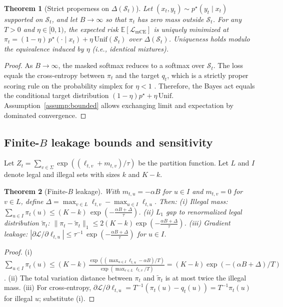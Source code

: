 \documentclass{article}
\newtheorem{theorem}{Theorem}
\begin{document}
\begin{theorem}[Strict properness on $\Delta(\mathcal{S}_t)$]\label{thm:proper}
Let $(x_t,y_t)\sim p^\star(y_t\mid x_t)$ supported on $\mathcal{S}_t$, and let $B\to\infty$ so that $\pi_t$ has zero mass outside $\mathcal{S}_t$. For any $T>0$ and $\eta\in[0,1)$, the expected risk $\mathbb{E}[\mathcal{L}_{\mathrm{mCE}}]$ is uniquely minimized at $\pi_t = (1-\eta)\,p^\star(\cdot\mid x_t) + \eta\,\mathrm{Unif}(\mathcal{S}_t)$ over $\Delta(\mathcal{S}_t)$. Uniqueness holds modulo the equivalence induced by $\eta$ (i.e., identical mixtures).
\end{theorem}

\begin{proof}
As $B\to\infty$, the masked softmax reduces to a softmax over $\mathcal{S}_t$. The loss equals the cross-entropy between $\pi_t$ and the target $q_t$, which is a strictly proper scoring rule on the probability simplex for $\eta<1$ \cite{gneiting2007scoring}. Therefore, the Bayes act equals the conditional target distribution $(1-\eta)p^\star+\eta\,\mathrm{Unif}$. Assumption~\ref{assump:bounded} allows exchanging limit and expectation by dominated convergence.
\end{proof}

\subsection{Finite-$B$ leakage bounds and sensitivity}
Let $Z_t=\sum_{v\in\Sigma}\exp((\ell_{t,v}+m_{t,v})/\tau)$ be the partition function. Let $L$ and $I$ denote legal and illegal sets with sizes $k$ and $K-k$.

\begin{theorem}[Finite-$B$ leakage]\label{thm:finiteB}
With $m_{t,u}=-\alpha B$ for $u\in I$ and $m_{t,v}=0$ for $v\in L$, define $\Delta=\max_{v\in L}\ell_{t,v}-\max_{u\in I}\ell_{t,u}$. Then:
(i) Illegal mass: $\sum_{u\in I}\pi_t(u) \le (K-k)\,\exp\!\left(-\frac{\alpha B + \Delta}{\tau}\right)$.
(ii) $L_1$ gap to renormalized legal distribution $\tilde{\pi}_t$: $\|\pi_t - \tilde{\pi}_t\|_1 \le 2(K-k)\exp\!\left(-\frac{\alpha B + \Delta}{\tau}\right)$.
(iii) Gradient leakage: $\left|\partial \mathcal{L}/\partial \ell_{t,u}\right| \le \tau^{-1}\,\exp\!\left(-\frac{\alpha B + \Delta}{\tau}\right)$ for $u\in I$.
\end{theorem}

\begin{proof}
(i) $\sum_{u\in I}\pi_t(u) \le (K-k)\,\frac{\exp((\max_{u\in I}\ell_{t,u}-\alpha B)/T)}{\exp(\max_{v\in L}\ell_{t,v}/T)}=(K-k)\exp(-(\alpha B + \Delta)/T)$. (ii) The total variation distance between $\pi_t$ and $\tilde{\pi}_t$ is at most twice the illegal mass. (iii) For cross-entropy, $\partial \mathcal{L}/\partial \ell_{t,u}=T^{-1}(\pi_t(u)-q_t(u))=T^{-1}\pi_t(u)$ for illegal $u$; substitute (i).
\end{proof}
\end{document}
